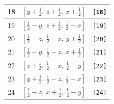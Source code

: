 \documentclass[fleqn,8pt]{jsarticle}
\begin{document}
\begin{longtable}{ccc}
18 & $\left[ y + \frac{1}{2},\, z + \frac{1}{2},\, x + \frac{1}{2} \right]$ & {\tt [18]} \\ \hline
19 & $\left[ \frac{1}{2} - y,\, z + \frac{1}{2},\, \frac{1}{2} - x \right]$ & {\tt [19]} \\ \hline
20 & $\left[ \frac{1}{2} - z,\, \frac{1}{2} - x,\, y + \frac{1}{2} \right]$ & {\tt [20]} \\ \hline
21 & $\left[ \frac{1}{2} - y,\, \frac{1}{2} - z,\, x + \frac{1}{2} \right]$ & {\tt [21]} \\ \hline
22 & $\left[ z + \frac{1}{2},\, \frac{1}{2} - x,\, \frac{1}{2} - y \right]$ & {\tt [22]} \\ \hline
23 & $\left[ y + \frac{1}{2},\, \frac{1}{2} - z,\, \frac{1}{2} - x \right]$ & {\tt [23]} \\ \hline
24 & $\left[ \frac{1}{2} - z,\, x + \frac{1}{2},\, \frac{1}{2} - y \right]$ & {\tt [24]} \\
\end{longtable}
\end{document}
